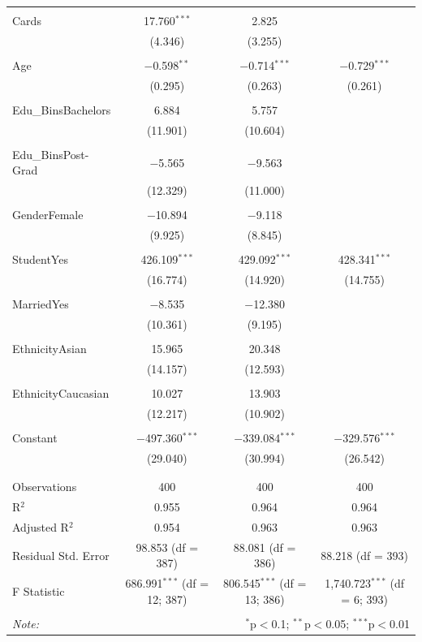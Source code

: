 \documentclass[11pt]{article}
\begin{document}
{\begin{table}[H]
{\begin{tabular}{@{\extracolsep{5pt}}lccc}
  & & & \\ 
 Cards & 17.760$^{***}$ & 2.825 &  \\ 
  & (4.346) & (3.255) &  \\ 
  & & & \\ 
 Age & $-$0.598$^{**}$ & $-$0.714$^{***}$ & $-$0.729$^{***}$ \\ 
  & (0.295) & (0.263) & (0.261) \\ 
  & & & \\ 
 Edu\_BinsBachelors & 6.884 & 5.757 &  \\ 
  & (11.901) & (10.604) &  \\ 
  & & & \\ 
 Edu\_BinsPost-Grad & $-$5.565 & $-$9.563 &  \\ 
  & (12.329) & (11.000) &  \\ 
  & & & \\ 
 GenderFemale & $-$10.894 & $-$9.118 &  \\ 
  & (9.925) & (8.845) &  \\ 
  & & & \\ 
 StudentYes & 426.109$^{***}$ & 429.092$^{***}$ & 428.341$^{***}$ \\ 
  & (16.774) & (14.920) & (14.755) \\ 
  & & & \\ 
 MarriedYes & $-$8.535 & $-$12.380 &  \\ 
  & (10.361) & (9.195) &  \\ 
  & & & \\ 
 EthnicityAsian & 15.965 & 20.348 &  \\ 
  & (14.157) & (12.593) &  \\ 
  & & & \\ 
 EthnicityCaucasian & 10.027 & 13.903 &  \\ 
  & (12.217) & (10.902) &  \\ 
  & & & \\ 
 Constant & $-$497.360$^{***}$ & $-$339.084$^{***}$ & $-$329.576$^{***}$ \\ 
  & (29.040) & (30.994) & (26.542) \\ 
  & & & \\ 
\hline \\[-1.8ex] 
Observations & 400 & 400 & 400 \\ 
R$^{2}$ & 0.955 & 0.964 & 0.964 \\ 
Adjusted R$^{2}$ & 0.954 & 0.963 & 0.963 \\ 
Residual Std. Error & 98.853 (df = 387) & 88.081 (df = 386) & 88.218 (df = 393) \\ 
F Statistic & 686.991$^{***}$ (df = 12; 387) & 806.545$^{***}$ (df = 13; 386) & 1,740.723$^{***}$ (df = 6; 393) \\ 
\hline 
\hline \\[-1.8ex] 
\textit{Note:}  & \multicolumn{3}{r}{$^{*}$p$<$0.1; $^{**}$p$<$0.05; $^{***}$p$<$0.01} \\ 
\end{tabular} 
}
\end{table}


}
\end{document}
